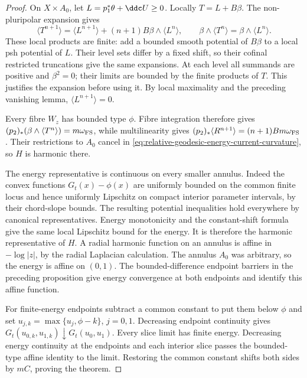 \begin{proof}
On $X\times A_0$, let $L=p_1^*\theta+\ddc U\geq0$. Locally $T=L+B\beta$. The non-pluripolar expansion gives
\[
 \langle T^{n+1}\rangle
       =\langle L^{n+1}\rangle+(n+1)B\beta\wedge\langle L^n\rangle,
             \qquad\beta\wedge\langle T^n\rangle
                         =\beta\wedge\langle L^n\rangle.
\]
These local products are finite: add a bounded smooth potential of $B\beta$ to a local psh potential of $L$. Their level sets differ by a fixed shift, so their cofinal restricted truncations give the same expansions. At each level all summands are positive and $\beta^2=0$; their limits are bounded by the finite products of $T$. This justifies the expansion before using it. By local maximality and the preceding vanishing lemma, $\langle L^{n+1}\rangle=0$.

Every fibre $W_z$ has bounded type $\phi$. Fibre integration therefore gives
$(p_2)_*(\beta\wedge\langle T^n\rangle)=m\omega_{\rm FS}$, while multilinearity gives
$(p_2)_*\langle R^{n+1}\rangle=(n+1)Bm\omega_{\rm FS}$.
Their restrictions to $A_0$ cancel in \eqref{eq:relative-geodesic-energy-current-curvature}, so $H$ is harmonic there.

The energy representative is continuous on every smaller annulus. Indeed the convex functions $G_t(x)-\phi(x)$ are uniformly bounded on the common finite locus and hence uniformly Lipschitz on compact interior parameter intervals, by their chord-slope bounds. The resulting potential inequalities hold everywhere by canonical representatives. Energy monotonicity and the constant-shift formula give the same local Lipschitz bound for the energy. It is therefore the harmonic representative of $H$. A radial harmonic function on an annulus is affine in $-\log|z|$, by the radial Laplacian calculation. The annulus $A_0$ was arbitrary, so the energy is affine on $(0,1)$. The bounded-difference endpoint barriers in the preceding proposition give energy convergence at both endpoints and identify this affine function.

For finite-energy endpoints subtract a common constant to put them below $\phi$ and set $u_{j,k}=\max\{u_j,\phi-k\}$, $j=0,1$. Decreasing endpoint continuity gives $G_t(u_{0,k},u_{1,k})\downarrow G_t(u_0,u_1)$. Every slice limit has finite energy. Decreasing energy continuity at the endpoints and each interior slice passes the bounded-type affine identity to the limit. Restoring the common constant shifts both sides by $mC$, proving the theorem.
\end{proof}

